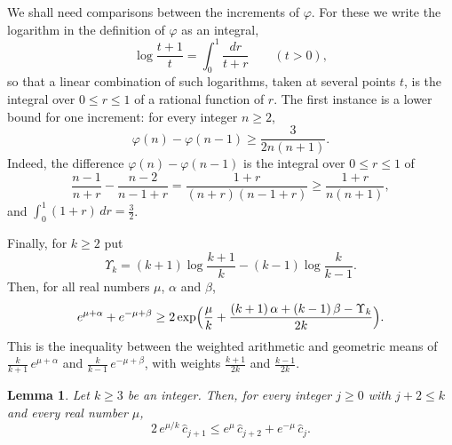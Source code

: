 \documentclass{amsart}
\newtheorem{lemma}[theorem]{Lemma}
\theoremstyle{definition}
\theoremstyle{remark}
\numberwithin{equation}{section}
\begin{document}
We shall need comparisons between the increments of $\varphi$. For these we write the logarithm in the definition of $\varphi$ as an integral,
\begin{equation}\label{eq:propk-logintegral}
\log\frac{t+1}{t}=\int_0^1\frac{dr}{t+r}\qquad(t>0),
\end{equation}
so that a linear combination of such logarithms, taken at several points $t$, is the integral over $0\le r\le 1$ of a rational function of $r$. The first instance is a lower bound for one increment: for every integer $n\ge 2$,
\begin{equation}\label{eq:propk-increment}
\varphi(n)-\varphi(n-1)\ge\frac{3}{2n(n+1)}.
\end{equation}
Indeed, the difference $\varphi(n)-\varphi(n-1)$ is the integral over $0\le r\le 1$ of
\[
\frac{n-1}{n+r}-\frac{n-2}{n-1+r}=\frac{1+r}{(n+r)(n-1+r)}\ge\frac{1+r}{n(n+1)},
\]
and $\int_0^1(1+r)\,dr=\frac32$.

Finally, for $k\ge 2$ put
\[
\Upsilon_k=(k+1)\log\frac{k+1}{k}-(k-1)\log\frac{k}{k-1}.
\]
Then, for all real numbers $\mu$, $\alpha$ and $\beta$,
\begin{equation}\label{eq:propk-amgm}
e^{\mu+\alpha}+e^{-\mu+\beta}\ge 2\exp\Bigl(\frac{\mu}{k}+\frac{(k+1)\,\alpha+(k-1)\,\beta-\Upsilon_k}{2k}\Bigr).
\end{equation}
This is the inequality between the weighted arithmetic and geometric means of $\frac{k}{k+1}\,e^{\mu+\alpha}$ and $\frac{k}{k-1}\,e^{-\mu+\beta}$, with weights $\frac{k+1}{2k}$ and $\frac{k-1}{2k}$.

\begin{lemma}\label{lem:tiltedconvexity}
Let $k\ge 3$ be an integer. Then, for every integer $j\ge 0$ with $j+2\le k$ and every real number $\mu$,
\[
2\,e^{\mu/k}\,\hat c_{j+1}\le e^{\mu}\,\hat c_{j+2}+e^{-\mu}\,\hat c_{j}.
\]
\end{lemma}
\end{document}
